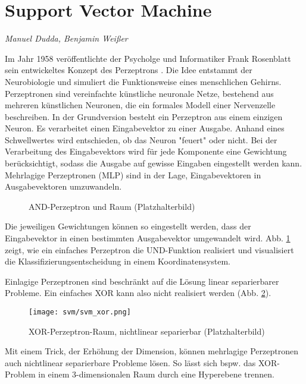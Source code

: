 \section{Support Vector Machine}
\textit{Manuel Dudda, Benjamin Weißer}

Im Jahr 1958 veröffentlichte der Psycholge und Informatiker Frank Rosenblatt sein entwickeltes Konzept des Perzeptrons \cite{rosenblatt58a}. 
Die Idee entstammt der Neurobiologie und simuliert die Funktionsweise eines menschlichen Gehirns. 
Perzeptronen sind vereinfachte künstliche neuronale Netze, bestehend aus mehreren künstlichen Neuronen, die ein formales Modell einer Nervenzelle beschreiben. 
In der Grundversion besteht ein Perzeptron aus einem einzigen Neuron. 
Es verarbeitet einen Eingabevektor zu einer Ausgabe. 
Anhand eines Schwellwertes wird entschieden, ob das Neuron "{}feuert"{} oder nicht. 
Bei der Verarbeitung des Eingabevektors wird für jede Komponente eine Gewichtung berücksichtigt, sodass die Ausgabe auf gewisse Eingaben eingestellt werden kann. 
Mehrlagige Perzeptronen (MLP) sind in der Lage, Eingabevektoren in Ausgabevektoren umzuwandeln. 

\begin{figure}[htbp] \centering
    \caption{AND-Perzeptron und Raum (Platzhalterbild)}
    \label{fig:perceptron_and}
\end{figure}

Die jeweiligen Gewichtungen können so eingestellt werden, dass der Eingabevektor in einen bestimmten Ausgabevektor umgewandelt wird. 
Abb. \ref{fig:perceptron_and} zeigt, wie ein einfaches Perzeptron die UND-Funktion realisiert und visualisiert die Klassifizierungsentscheidung in einem Koordinatensystem. 

Einlagige Perzeptronen sind beschränkt auf die Lösung linear separierbarer Probleme. 
Ein einfaches XOR kann also nicht realisiert werden (Abb. \ref{fig:perceptron_xor}). 

\begin{figure}[htbp] \centering
    \texttt{[image: svm/svm\_xor.png]}
    \caption{XOR-Perzeptron-Raum, nichtlinear separierbar (Platzhalterbild)}
    \label{fig:perceptron_xor}
\end{figure}


Mit einem Trick, der Erhöhung der Dimension, können mehrlagige Perzeptronen auch nichtlinear separierbare Probleme lösen. 
So lässt sich bspw. das XOR-Problem in einem 3-dimensionalen Raum durch eine Hyperebene trennen.

